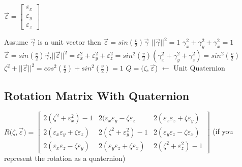 \documentclass{article}
\begin{document}
	$\vec{\varepsilon} = \begin{bmatrix}\varepsilon_x \\ \varepsilon_y \\ \varepsilon_z \end{bmatrix} $
	\begin{center}
	Assume $\vec{\gamma}$ is a unit vector then $\vec{\varepsilon} = sin(\frac{v}{2})\vec{\gamma}$
	\newline
	$||\vec{\gamma}||^2 = 1$
	\newline
	$\gamma_x^2 + \gamma_y^2 + \gamma_x^2 = 1$
	\newline
	\newline
	$\vec{\varepsilon}  = sin(\frac{v}{2})\vec{\gamma}$,\space$||\vec{\varepsilon}||^2 = \varepsilon_x^2 + \varepsilon_y^2 + \varepsilon_z^2 = sin^2(\frac{v}{2})(\gamma_x^2 + \gamma_y^2 + \gamma_z^2) = sin^2(\frac{v}{2})$
	\newline
	\newline
	$\zeta^2 + ||\vec{\varepsilon}||^2 = cos^2(\frac{v}{2}) + sin^2(\frac{v}{2}) = 1$
	\newline
	\newline
	$Q = ($\space$\zeta, \vec{\varepsilon}$\space)\space\space\space{} $\leftarrow$ Unit Quaternion
	
	\end{center}

\subsection{Rotation Matrix With Quaternion}
\begin{center}
	$R($\space$\zeta, \vec{\varepsilon}$\space$) = 
	\begin{bmatrix}
	2(\zeta^2 + \varepsilon_x^2)-1 & 2(\varepsilon_x\varepsilon_y - \zeta\varepsilon_z & 2(\varepsilon_x\varepsilon_z + \zeta\varepsilon_y) \\
	2(\varepsilon_x\varepsilon_y + \zeta\varepsilon_z) & 2(\zeta^2 + \varepsilon_y^2)-1 & 2(\varepsilon_y\varepsilon_z - \zeta\varepsilon_x) \\
	2(\varepsilon_x\varepsilon_z - \zeta\varepsilon_y) & 2(\varepsilon_y\varepsilon_z + \zeta\varepsilon_x) & 2(\zeta^2 + \varepsilon_z^2)-1
	\end{bmatrix}$
	\newline
	(if you represent the rotation as a quaternion)
\end{center}
\end{document}
